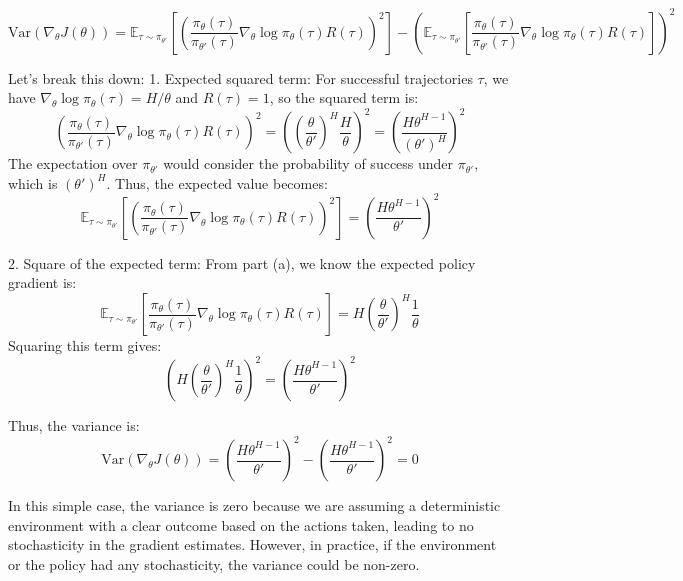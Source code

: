 \documentclass{article}
\begin{document}
\begin{enumerate}
\begin{enumerate}
    \[
    \text{Var}(\nabla_\theta J(\theta)) = \mathbb{E}_{\tau \sim \pi_{\theta'}} \left[ \left( \frac{\pi_\theta(\tau)}{\pi_{\theta'}(\tau)} \nabla_\theta \log \pi_\theta(\tau) R(\tau) \right)^2 \right] - \left( \mathbb{E}_{\tau \sim \pi_{\theta'}} \left[ \frac{\pi_\theta(\tau)}{\pi_{\theta'}(\tau)} \nabla_\theta \log \pi_\theta(\tau) R(\tau) \right] \right)^2
    \]
    
    Let’s break this down:
    1. Expected squared term:
    For successful trajectories \( \tau \), we have \( \nabla_\theta \log \pi_\theta(\tau) = H/\theta \) and \( R(\tau) = 1 \), so the squared term is:
    \[
    \left( \frac{\pi_\theta(\tau)}{\pi_{\theta'}(\tau)} \nabla_\theta \log \pi_\theta(\tau) R(\tau) \right)^2 = \left( \left( \frac{\theta}{\theta'} \right)^H \frac{H}{\theta} \right)^2 = \left( \frac{H \theta^{H-1}}{(\theta')^H} \right)^2
    \]
    The expectation over \( \pi_{\theta'} \) would consider the probability of success under \( \pi_{\theta'} \), which is \( (\theta')^H \). Thus, the expected value becomes:
    \[
    \mathbb{E}_{\tau \sim \pi_{\theta'}} \left[ \left( \frac{\pi_\theta(\tau)}{\pi_{\theta'}(\tau)} \nabla_\theta \log \pi_\theta(\tau) R(\tau) \right)^2 \right] = \left( \frac{H \theta^{H-1}}{\theta'} \right)^2
    \]
    
    2. Square of the expected term:
    From part (a), we know the expected policy gradient is:
    \[
    \mathbb{E}_{\tau \sim \pi_{\theta'}} \left[ \frac{\pi_\theta(\tau)}{\pi_{\theta'}(\tau)} \nabla_\theta \log \pi_\theta(\tau) R(\tau) \right] = H \left( \frac{\theta}{\theta'} \right)^H \frac{1}{\theta}
    \]
    Squaring this term gives:
    \[
    \left( H \left( \frac{\theta}{\theta'} \right)^H \frac{1}{\theta} \right)^2 = \left( \frac{H \theta^{H-1}}{\theta'} \right)^2
    \]
    
    Thus, the variance is:
    \[
    \text{Var}(\nabla_\theta J(\theta)) = \left( \frac{H \theta^{H-1}}{\theta'} \right)^2 - \left( \frac{H \theta^{H-1}}{\theta'} \right)^2 = 0
    \]
    
    In this simple case, the variance is zero because we are assuming a deterministic environment with a clear outcome based on the actions taken, leading to no stochasticity in the gradient estimates. However, in practice, if the environment or the policy had any stochasticity, the variance could be non-zero.

\end{enumerate}

\end{enumerate}
\end{document}
